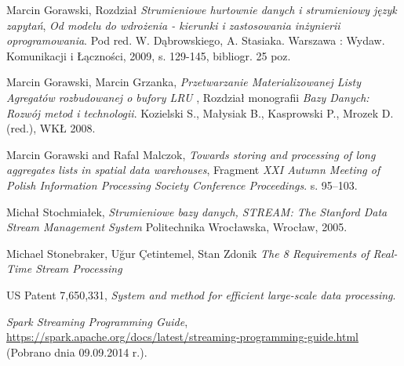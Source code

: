 \documentclass[12pt]{article}
\begin{document}
\newpage
\begin{thebibliography}{9}

  Marcin Gorawski,
  Rozdział \emph{Strumieniowe hurtownie danych i strumieniowy język zapytań},
  \emph{Od modelu do wdrożenia - kierunki i zastosowania inżynierii oprogramowania}.
  Pod red. W. Dąbrowskiego, A. Stasiaka.
  Warszawa : Wydaw. Komunikacji i Łączności,
  2009,
  s. 129-145,
  bibliogr. 25 poz.

  Marcin Gorawski, Marcin Grzanka,
  \emph{Przetwarzanie Materializowanej Listy Agregatów rozbudowanej o bufory LRU },
  Rozdział monografii
  \emph{Bazy Danych: Rozwój metod i technologii}.
  Kozielski S., Małysiak B., Kasprowski P., Mrozek D. (red.),
  WKŁ 2008.

  Marcin Gorawski and Rafal Malczok,
  \emph{Towards storing and processing of long aggregates lists in spatial data warehouses},
  Fragment
  \emph{XXI Autumn Meeting of Polish Information Processing Society Conference Proceedings}.
  s. 95–103.

  Michał Stochmiałek,
  \emph{Strumieniowe bazy danych, STREAM: The Stanford Data Stream Management System}
  Politechnika Wrocławska,
  Wrocław, 2005.

  Michael Stonebraker, Uğur Çetintemel, Stan Zdonik
  \emph{The 8 Requirements of Real-Time Stream Processing}

  US Patent 7,650,331,
  \emph{System and method for efficient large-scale data processing}.

  \emph{Spark Streaming Programming Guide},
  \url{https://spark.apache.org/docs/latest/streaming-programming-guide.html}
  (Pobrano dnia 09.09.2014 r.).


\end{thebibliography}

%
\end{document}
